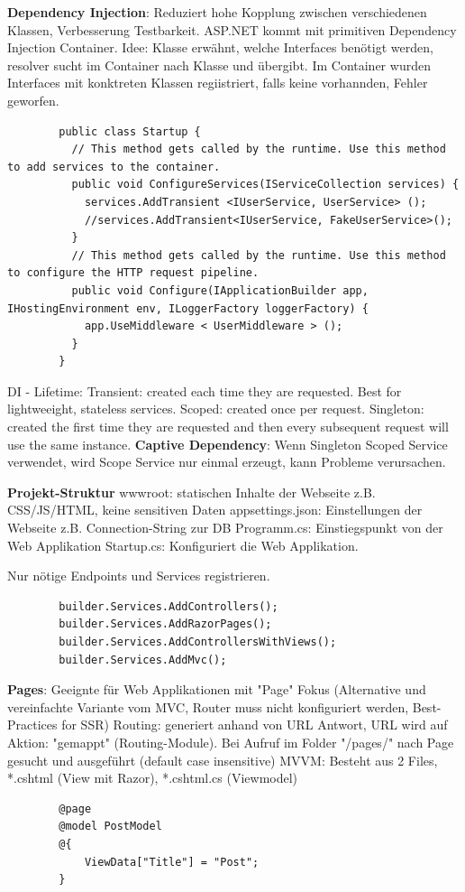 \documentclass[10pt,landscape]{article}
\begin{document}
\begin{multicols}{2}
        \textbf{Dependency Injection}: Reduziert hohe Kopplung zwischen verschiedenen Klassen, Verbesserung Testbarkeit. ASP.NET kommt mit primitiven Dependency Injection Container.
        Idee: Klasse erwähnt, welche Interfaces benötigt werden, resolver sucht im Container nach Klasse und übergibt. Im Container wurden Interfaces mit konktreten Klassen regiistriert, falls keine vorhannden, Fehler geworfen.

        \begin{lstlisting}
        public class Startup {
          // This method gets called by the runtime. Use this method to add services to the container.
          public void ConfigureServices(IServiceCollection services) {
            services.AddTransient <IUserService, UserService> ();
            //services.AddTransient<IUserService, FakeUserService>();
          }
          // This method gets called by the runtime. Use this method to configure the HTTP request pipeline.
          public void Configure(IApplicationBuilder app, IHostingEnvironment env, ILoggerFactory loggerFactory) {
            app.UseMiddleware < UserMiddleware > ();
          }
        }
        \end{lstlisting}

        DI - Lifetime: Transient: created each time they are requested. Best for lightweeight, stateless services. Scoped: created once per request. Singleton: created the first time they are requested and then every subsequent request will use the same instance.
        \textbf{Captive Dependency}: Wenn Singleton Scoped Service verwendet, wird Scope Service nur einmal erzeugt, kann Probleme verursachen.

        \textbf{Projekt-Struktur}
        wwwroot: statischen Inhalte der Webseite z.B. CSS/JS/HTML, keine sensitiven Daten
        appsettings.json: Einstellungen der Webseite z.B. Connection-String zur DB
        Programm.cs: Einstiegspunkt von der Web Applikation
        Startup.cs: Konfiguriert die Web Applikation.

        Nur nötige Endpoints und Services registrieren.

        \begin{lstlisting}
        builder.Services.AddControllers();
        builder.Services.AddRazorPages();
        builder.Services.AddControllersWithViews();
        builder.Services.AddMvc();
        \end{lstlisting}

        \textbf{Pages}: Geeignte für Web Applikationen mit "Page" Fokus (Alternative und vereinfachte Variante vom MVC, Router muss nicht konfiguriert werden, Best-Practices for SSR)
        Routing: generiert anhand von URL Antwort, URL wird auf Aktion: "gemappt" (Routing-Module). Bei Aufruf im Folder "/pages/" nach Page gesucht und ausgeführt (default case insensitive)
        MVVM: Besteht aus 2 Files, *.cshtml (View mit Razor), *.cshtml.cs (Viewmodel)
        \begin{lstlisting}
        @page
        @model PostModel
        @{
            ViewData["Title"] = "Post";
        }


\end{lstlisting}
\end{multicols}
\end{document}
